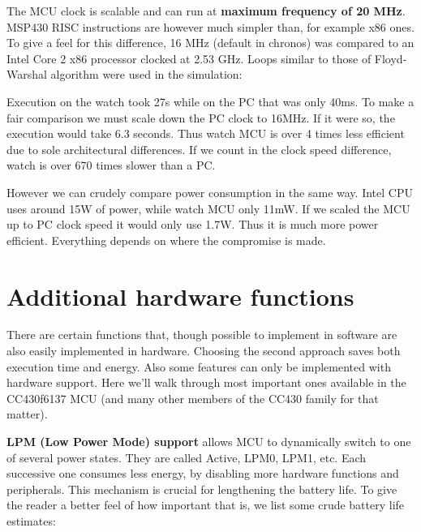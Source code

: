 The MCU clock is scalable and can run at {\bf maximum frequency of 20 MHz}.
MSP430 RISC instructions are however much simpler than, for example
x86 ones. To give a feel for this difference, 16 MHz (default in
chronos) was compared to an Intel Core 2 x86 processor clocked at 2.53
GHz. Loops similar to those of Floyd-Warshal algorithm were used in the
simulation:

% 
% 

Execution on the watch took 27s while on the PC that was only 40ms.
To make a fair comparison we must scale down the PC clock to 16MHz. If
it were so, the execution would take 6.3 seconds. Thus watch MCU
is over 4 times less efficient due to sole architectural differences.
If we count in the clock speed difference, watch is over 670 times
slower than a PC.

However we can crudely compare power consumption in the same way.
Intel CPU uses around 15W of power, while watch MCU only 11mW. If we
scaled the MCU up to PC clock speed it would only use 1.7W. Thus it is
much more power efficient. Everything depends on where the compromise
is made.

\section{Additional hardware functions}

There are certain functions that, though possible to implement in
software are also easily implemented in hardware. Choosing the second
approach saves both execution time and energy.  Also some features can
only be implemented with hardware support.  Here we'll walk through
most important ones available in the CC430f6137 MCU (and many other
members of the CC430 family for that matter).

{\bf LPM (Low Power Mode) support} allows MCU to dynamically switch to
one of several power states.  They are called Active, LPM0, LPM1, etc.
Each successive one consumes less energy, by disabling more hardware
functions and peripherals. This mechanism is crucial for lengthening
the battery life. To give the reader a better feel of how important
that is, we list some crude battery life estimates:

